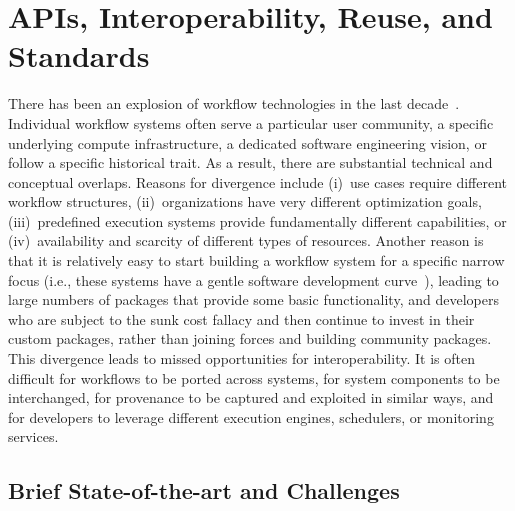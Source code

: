 \section{APIs, Interoperability, Reuse, and Standards}
\label{sec:interoperability}

There has been an explosion of workflow technologies in the last decade~\cite{workflow-systems}. Individual workflow systems often serve a particular user community, a specific underlying compute infrastructure, a dedicated software engineering vision, or follow a specific historical trait. As a result, there are substantial technical and conceptual overlaps. Reasons for divergence include (i)~use cases require different workflow structures, (ii)~organizations have very different optimization goals, (iii)~predefined execution systems provide fundamentally different capabilities, or (iv)~availability and scarcity of different types of resources. Another reason is that it is relatively easy to start building a workflow system for a specific narrow focus (i.e., these systems have a gentle software development curve~\cite{SDCblog}), leading to large numbers of packages that provide some basic functionality, and developers who are subject to the sunk cost fallacy and then continue to invest in their custom packages, rather than joining forces and building community packages. This divergence leads to missed opportunities for interoperability. It is often difficult for workflows to be ported across systems, for system components to be interchanged, for provenance to be captured and exploited in similar ways, and for developers to leverage different execution engines, schedulers, or monitoring services.


\subsection{Brief State-of-the-art and Challenges}

